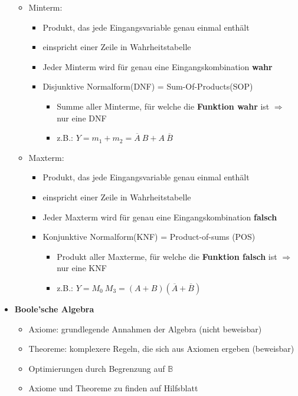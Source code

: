 \begin{itemize}
\begin{itemize}
	 \item Minterm:
	 	\begin{itemize}
	 	\item Produkt, das jede Eingangsvariable genau einmal enthält
	 	\item einspricht einer Zeile in Wahrheitstabelle
	 	\item Jeder Minterm wird für genau eine Eingangskombination \textbf{wahr}
	 	\item Disjunktive Normalform(DNF) = Sum-Of-Products(SOP)
	 		\begin{itemize}
	 		\item Summe aller Minterme, für welche die \textbf{Funktion wahr} ist $\Rightarrow$ nur eine DNF
	 		\item z.B.: $Y = m_1+m_2= \overline{A}~B + A ~ \overline{B}$
	 		\end{itemize}
		\end{itemize}	 		
	
	\item Maxterm:
		\begin{itemize}
	 	\item Produkt, das jede Eingangsvariable genau einmal enthält
	 	\item einspricht einer Zeile in Wahrheitstabelle
	 	\item Jeder Maxterm wird für genau eine Eingangskombination \textbf{falsch}
	 	\item Konjunktive Normalform(KNF) = Product-of-sums (POS)
	 		\begin{itemize}
	 		\item Produkt aller Maxterme, für welche die \textbf{Funktion falsch} ist $\Rightarrow$ nur eine KNF
	 		\item z.B.: $Y=M_0~M_3=(A+B)(\overline{A} + \overline{B})$
	 		\end{itemize}
		\end{itemize}
	

	\end{itemize}
	
\item \textbf{Boole'sche Algebra}
	\begin{itemize}
	\item Axiome: grundlegende Annahmen der Algebra (nicht beweisbar)
	\item Theoreme: komplexere Regeln, die sich aus Axiomen ergeben (beweisbar)
	\item Optimierungen durch Begrenzung auf $\mathbb{B}$
	\item Axiome und Theoreme zu finden auf Hilfsblatt
	\end{itemize}
	

\end{itemize}
